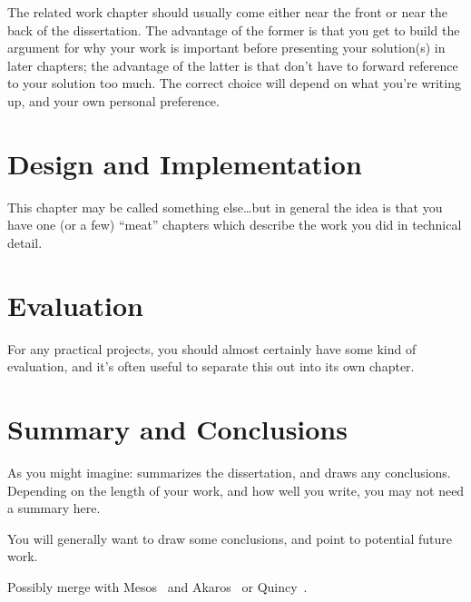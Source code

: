 \documentclass[a4paper,12pt,twoside,openright]{report}
\begin{document}
The related work chapter should usually come either near the front or
near the back of the dissertation. The advantage of the former is that
you get to build the argument for why your work is important before
presenting your solution(s) in later chapters; the advantage of the
latter is that don't have to forward reference to your solution too
much. The correct choice will depend on what you're writing up, and
your own personal preference.



\chapter{Design and Implementation} 

This chapter may be called something else\ldots but in general 
the idea is that you have one (or a few) ``meat'' chapters which
describe the work you did in technical detail. 


\chapter{Evaluation} 

For any practical projects, you should almost certainly have
some kind of evaluation, and it's often useful to separate 
this out into its own chapter. 


\chapter{Summary and Conclusions} 

As you might imagine: summarizes the dissertation, and draws 
any conclusions. Depending on the length of your work, and 
how well you write, you may not need a summary here. 

You will generally want to draw some conclusions, and point
to potential future work. 

Possibly merge with Mesos~\cite{Hindman:2011:MPF} and
Akaros~\cite{Rhoden:2011:IPE} or Quincy~\cite{Isard:2009:QFS}.



\appendix
\singlespacing

 
 
\end{document}
